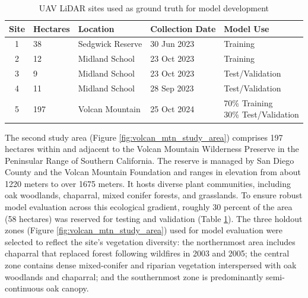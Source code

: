\documentclass[remotesensing,article,submit,pdftex,moreauthors]{Definitions/mdpi}
\begin{document}
\begin{table}[H]
  \centering
  \caption{UAV LiDAR sites used as ground truth for model development}
  \label{tab:lidar_sites}
  \begin{tabular}{@{}cllll@{}}
    \toprule
    Site & Hectares & Location & Collection Date & Model Use \\ \midrule
    1 & 38  & Sedgwick Reserve & 30 Jun 2023 & Training \\
    2 & 12  & Midland School   & 23 Oct 2023 & Training \\
    3 &  9  & Midland School   & 23 Oct 2023 & Test/Validation \\
    4 & 11  & Midland School   & 28 Sep 2023 & Test/Validation \\
    5 & 197 & Volcan Mountain  & 25 Oct 2024 &
        \makecell[l]{70\% Training\\ 30\% Test/Validation} \\
    \bottomrule
  \end{tabular}
\end{table}

The second study area (Figure \ref{fig:volcan_mtn_study_area}) comprises 197 hectares within and adjacent to the Volcan Mountain Wilderness Preserve in the Peninsular Range of Southern California. The reserve is managed by San Diego County and the Volcan Mountain Foundation and ranges in elevation from about 1220 meters to over 1675 meters.
 It hosts diverse plant communities, including oak woodlands, chaparral, mixed conifer forests, and grasslands.  To ensure robust model evaluation across this ecological gradient, roughly 30 percent of the area (58 hectares) was reserved for testing and validation (Table \ref{tab:lidar_sites}). The three holdout zones (Figure \ref{fig:volcan_mtn_study_area}) used for model evaluation were selected to reflect the site’s vegetation diversity: the northernmost area includes chaparral that replaced forest following wildfires in 2003 and 2005; the central zone contains dense mixed-conifer and riparian vegetation interspersed with oak woodlands and chaparral; and the southernmost zone is predominantly semi-continuous oak canopy.
\end{document}
